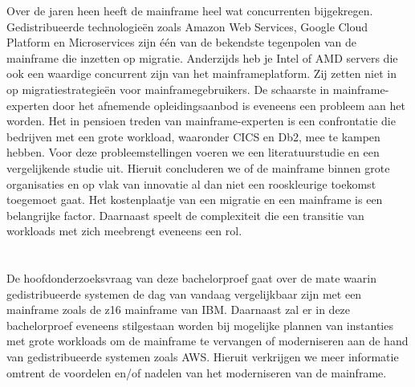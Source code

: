 Over de jaren heen heeft de mainframe heel wat concurrenten bijgekregen. Gedistribueerde technologieën zoals Amazon Web Services, Google Cloud Platform en Microservices zijn één van de bekendste tegenpolen van de mainframe die inzetten op migratie. Anderzijds heb je Intel of AMD servers die ook een waardige concurrent zijn van het mainframeplatform. Zij zetten niet in op migratiestrategieën voor mainframegebruikers. De schaarste in mainframe-experten door het afnemende opleidingsaanbod is eveneens een probleem aan het worden. Het in pensioen treden van mainframe-experten is een confrontatie die bedrijven met een grote workload, waaronder CICS en Db2, mee te kampen hebben. Voor deze probleemstellingen voeren we een literatuurstudie en een vergelijkende studie uit. Hieruit concluderen we of de mainframe binnen grote organisaties en op vlak van innovatie al dan niet een rooskleurige toekomst toegemoet gaat. Het kostenplaatje van een migratie en een mainframe is een belangrijke factor. Daarnaast speelt de complexiteit die een transitie van workloads met zich meebrengt eveneens een rol. 

\section{}
\label{sec:onderzoeksvraag}

De hoofdonderzoeksvraag van deze bachelorproef gaat over de mate waarin gedistribueerde systemen de dag van vandaag vergelijkbaar zijn met een mainframe zoals de z16 mainframe van IBM. Daarnaast zal er in deze bachelorproef eveneens stilgestaan worden bij mogelijke plannen van instanties met grote workloads om de mainframe te vervangen of moderniseren aan de hand van gedistribueerde systemen zoals AWS. Hieruit verkrijgen we meer informatie omtrent de voordelen en/of nadelen van het moderniseren van de mainframe. 

\section{}
\label{sec:onderzoeksdoelstelling}

\subsection{}


